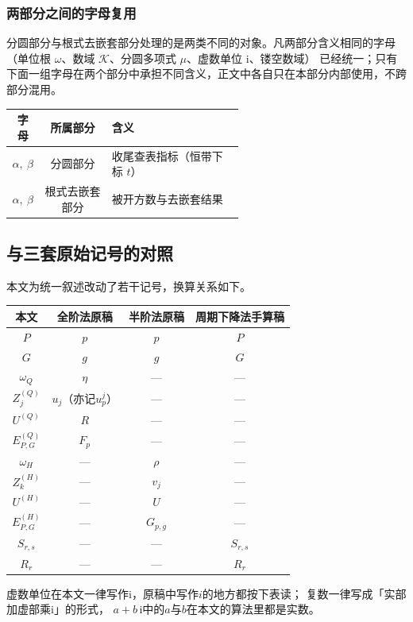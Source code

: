 \documentclass[UTF8,a4paper,11pt]{ctexart}
\newcommand{\ii}{\mathrm{i}}
\begin{document}
\subsubsection{两部分之间的字母复用}

分圆部分与根式去嵌套部分处理的是两类不同的对象。凡两部分含义相同的字母
（单位根 $\omega$、数域 $\mathscr{K}$、分圆多项式 $\mu$、虚数单位 $\ii$、镂空数域）
已经统一；只有下面一组字母在两个部分中承担不同含义，正文中各自只在本部分内部使用，不跨部分混用。\par

\begin{center}
\begin{tabular}{c|c|>{\raggedright\arraybackslash}p{0.58\linewidth}}
\toprule
字母 & 所属部分 & 含义 \\
\midrule
$\alpha,\ \beta$ & 分圆部分 & 收尾查表指标（恒带下标 $t$） \\
$\alpha,\ \beta$ & 根式去嵌套部分 & 被开方数与去嵌套结果 \\
\bottomrule
\end{tabular}
\end{center}

\subsection{与三套原始记号的对照}
本文为统一叙述改动了若干记号，换算关系如下。
\begin{center}
\begin{tabular}{c|c|c|c}
\toprule
本文 & 全阶法原稿 & 半阶法原稿 & 周期下降法手算稿 \\
\midrule
$P$ & $p$ & $p$ & $P$ \\
$G$ & $g$ & $g$ & $G$ \\
$\omega_Q$ & $\eta$ & --- & --- \\
$Z^{(Q)}_j$ & $u_j$（亦记$u_p^j$） & --- & --- \\
$U^{(Q)}$ & $R$ & --- & --- \\
$E^{(Q)}_{P,G}$ & $F_p$ & --- & --- \\
$\omega_H$ & --- & $\rho$ & --- \\
$Z^{(H)}_k$ & --- & $v_j$ & --- \\
$U^{(H)}$ & --- & $U$ & --- \\
$E^{(H)}_{P,G}$ & --- & $G_{p,g}$ & --- \\
$S_{r,s}$ & --- & --- & $S_{r,s}$ \\
$R_r$ & --- & --- & $R_r$ \\
\bottomrule
\end{tabular}
\end{center}
虚数单位在本文一律写作$\ii$，原稿中写作$i$的地方都按下表读；
复数一律写成「实部加虚部乘$\ii$」的形式，
$a+b\,\ii$中的$a$与$b$在本文的算法里都是实数。
\end{document}
